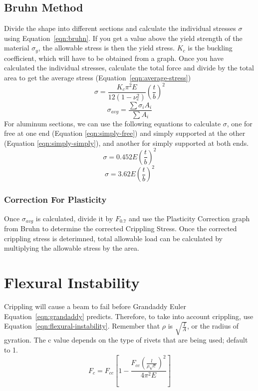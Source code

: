 \documentclass{article}
\begin{document}
\subsection{Bruhn Method}
Divide the shape into different sections and calculate the individual stresses $\sigma$ using Equation~\ref{eqn:bruhn}.
If you get a value above the yield strength of the material $\sigma_y$, the allowable stress is then the yield stress.
$K_c$ is the buckling coefficient, which will have to be obtained from a graph.
Once you have calculated the individual stresses, calculate the total force and divide by the total area to get the average stress (Equation~\ref{eqn:average-stress})
\begin{equation}\label{eqn:bruhn}
    \sigma = \frac{K_c \pi ^ 2 E}{12(1 - \nu_e ^ 2)}\left(\frac{t}{b}\right) ^ 2
\end{equation}
\begin{equation}\label{eqn:average-stress}
    \sigma_{avg} = \frac{\sum\sigma_i A_i}{\sum A_i}
\end{equation}
For aluminum sections, we can use the following equations to calculate $\sigma$, one for free at one end (Equation \ref{eqn:simply-free}) and simply supported at the other (Equation \ref{eqn:simply-simply}), and another for simply supported at both ends.
\begin{equation}\label{eqn:simply-free}
   \sigma = 0.452E\left(\frac{t}{b}\right) ^ 2
\end{equation}
\begin{equation}\label{eqn:simply-simply}
    \sigma = 3.62E\left(\frac{t}{b}\right) ^ 2
\end{equation}
\subsubsection{Correction For Plasticity}
Once $\sigma_{avg}$ is calculated, divide it by $F_{0.7}$ and use the Plasticity Correction graph from Bruhn to determine the corrected Crippling Stress.
Once the corrected crippling stress is deterimned, total allowable load can be calculated by multiplying the allowable stress by the area.
\section{Flexural Instability}
Crippling will cause a beam to fail before Grandaddy Euler Equation~\ref{eqn:grandaddy} predicts.
Therefore, to take into account crippling, use Equation~\ref{eqn:flexural-instability}.
Remember that $\rho$ is $\sqrt{\frac{I}{A}}$, or the radius of gyration.
The c value depends on the type of rivets that are being used; default to 1.
\begin{equation}\label{eqn:flexural-instability}
    F_c = F_{cc}\left[1 - \frac{F_{cc} \left(\frac{l}{\rho \sqrt{c}}\right) ^ 2}{4\pi ^2 E}\right]
\end{equation}
\end{document}
